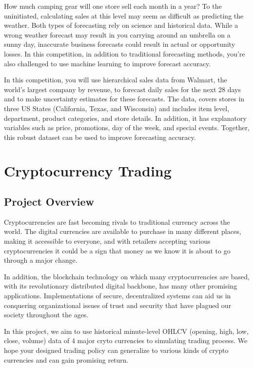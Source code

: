\documentclass[11pt]{article}
\begin{document}
How much camping gear will one store sell each month in a year? To the uninitiated, calculating sales at this level may seem as difficult as predicting the weather. Both types of forecasting rely on science and historical data. While a wrong weather forecast may result in you carrying around an umbrella on a sunny day, inaccurate business forecasts could result in actual or opportunity losses. In this competition, in addition to traditional forecasting methods, you're also challenged to use machine learning to improve forecast accuracy.

In this competition, you will use hierarchical sales data from Walmart, the world's largest company by revenue, to forecast daily sales for the next 28 days and to make uncertainty estimates for these forecasts. The data, covers stores in three US States (California, Texas, and Wisconsin) and includes item level, department, product categories, and store details. In addition, it has explanatory variables such as price, promotions, day of the week, and special events. Together, this robust dataset can be used to improve forecasting accuracy.

\section{Cryptocurrency Trading}
\subsection{Project Overview}
Cryptocurrencies are fast becoming rivals to traditional currency across the world. The digital currencies are available to purchase in many different places, making it accessible to everyone, and with retailers accepting various cryptocurrencies it could be a sign that money as we know it is about to go through a major change.

In addition, the blockchain technology on which many cryptocurrencies are based, with its revolutionary distributed digital backbone, has many other promising applications. Implementations of secure, decentralized systems can aid us in conquering organizational issues of trust and security that have plagued our society throughout the ages. 

In this project, we aim to use historical minute-level OHLCV (opening, high, low, close, volume) data of 4 major cryto currencies to simulating trading process. We hope your designed trading policy can generalize to various kinds of crypto currencies and can gain promising return.
\end{document}
